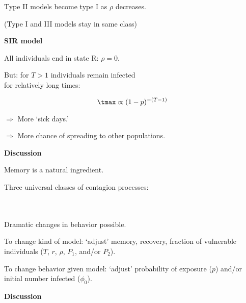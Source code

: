   Type II models become type I as $\rho$ decreases.

  (Type I and III models stay in same class)



  \textbf{SIR model}
  
  All individuals end in state R: $\rho=0$.

  But: for $T>1$ individuals remain infected\\ 
  for relatively long times:

  $$ \tmax \propto (1-p)^{-(T-1)} $$

  $\Rightarrow$ More `sick days.'

  $\Rightarrow$ More chance of spreading to
  other populations.

%
%  
% 
%  
%
 

  \textbf{Discussion}

   Memory is a natural ingredient. %

   Three universal classes of contagion processes:\\
  \qquad {}\\
  \qquad {} \\ %
  \qquad {}

   Dramatic changes in behavior possible.

   To change kind of model: `adjust' memory, recovery, fraction
  of vulnerable individuals ($T$, $r$, $\rho$, $P_1$, and/or $P_2$).

   To change behavior given model: `adjust' probability
  of exposure ($p$) and/or initial number infected ($\phi_0$).

  \textbf{Discussion}


